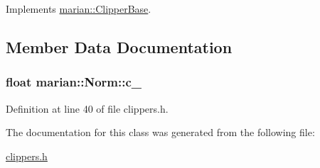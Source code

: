 Implements \hyperlink{classmarian_1_1ClipperBase_a6f7b11e38c66ff53736ad8a6c2a90610}{marian\+::\+Clipper\+Base}.



\subsection{Member Data Documentation}
\subsubsection[{\texorpdfstring{c\+\_\+}{c_}}]{\setlength{\rightskip}{0pt plus 5cm}float marian\+::\+Norm\+::c\+\_\+\hspace{0.3cm}{\ttfamily [private]}}\hypertarget{classmarian_1_1Norm_a84440b80fbdc43302662be4b8d1e47d2}{}\label{classmarian_1_1Norm_a84440b80fbdc43302662be4b8d1e47d2}


Definition at line 40 of file clippers.\+h.



The documentation for this class was generated from the following file\+:\begin{DoxyCompactItemize}
\item 
\hyperlink{clippers_8h}{clippers.\+h}\end{DoxyCompactItemize}
